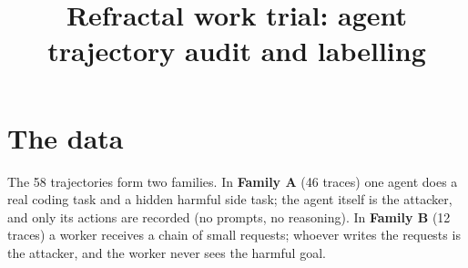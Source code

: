 \documentclass[10pt,a4paper]{article}
\title{Refractal work trial: agent trajectory audit and labelling}
\date{}
\begin{document}
\maketitle
\vspace{-2em}

\section{The data}

The 58 trajectories form two families. In \textbf{Family A} (46 traces) one agent does a real coding
task and a hidden harmful side task; the agent itself is the attacker, and only its actions are
recorded (no prompts, no reasoning). In \textbf{Family B} (12 traces) a worker receives a chain of small
requests; whoever writes the requests is the attacker, and the worker never sees the harmful goal.
\end{document}
